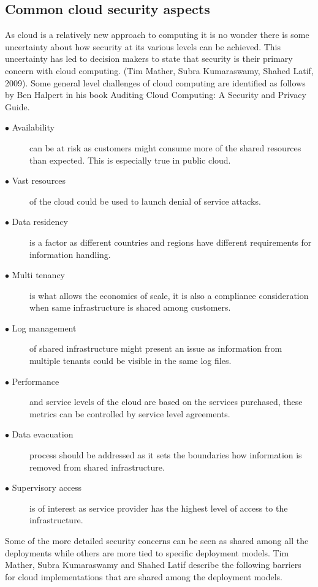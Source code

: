 \documentclass{article}
\begin{document}
\subsection{Common cloud security aspects}
As cloud is a relatively new approach to computing it is no wonder there is some uncertainty about how security at its various levels can be achieved. This uncertainty has led to decision makers to state that security is their primary concern with cloud computing. (Tim Mather, Subra Kumaraswamy, Shahed Latif, 2009). 
Some general level challenges of cloud computing are identified as follows by Ben Halpert in his book Auditing Cloud Computing: A Security and Privacy Guide.
\begin{description}
	\item[$\bullet$ Availability] can be at risk as customers might consume more of the shared resources than expected. This is especially true in public cloud.
	\item[$\bullet$ Vast resources] of the cloud could be used to launch denial of service attacks.
	\item[$\bullet$ Data residency] is a factor as different countries and regions have different requirements for information handling.
	\item[$\bullet$ Multi tenancy] is what allows the economics of scale, it is also a compliance consideration when same infrastructure is shared among customers.
	\item[$\bullet$ Log management] of shared infrastructure might present an issue as information from multiple tenants could be visible in the same log files. 
	\item[$\bullet$ Performance] and service levels of the cloud are based on the services purchased, these metrics can be controlled by service level agreements.
	\item[$\bullet$ Data evacuation] process should be addressed as it sets the boundaries how information is removed from shared infrastructure.
	\item[$\bullet$ Supervisory access] is of interest as service provider has the highest level of access to the infrastructure.
\end{description}
Some of the more detailed security concerns can be seen as shared among all the deployments while others are more tied to specific deployment models.
Tim Mather, Subra Kumaraswamy and Shahed Latif describe the following barriers for cloud implementations that are shared among the deployment models.
\end{document}
